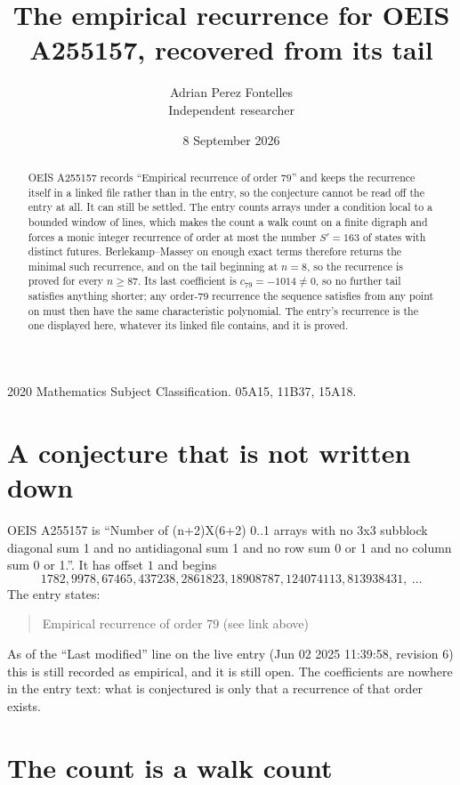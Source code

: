 \documentclass[11pt,a4paper]{article}
\title{The empirical recurrence for OEIS A255157, recovered from its tail}
\author{Adrian Perez Fontelles\\ \small Independent researcher}
\date{8 September 2026}
\theoremstyle{plain}
\theoremstyle{definition}
\begin{document}
\maketitle

\begin{abstract}
OEIS A255157 records ``Empirical recurrence of order $79$'' and keeps the recurrence itself in
a linked file rather than in the entry, so the conjecture cannot be read off the entry at all.
It can still be settled. The entry counts arrays under a condition local to a bounded window of
lines, which makes the count a walk count on a finite digraph and forces a monic integer
recurrence of order at most the number $S'=163$ of states with distinct futures. Berlekamp--Massey on
enough exact terms therefore returns the minimal such recurrence, and on the tail beginning at $n=8$, so the recurrence is proved for every $n\ge87$.
Its last coefficient is $c_{79}=-1014\neq0$, so no further tail satisfies anything
shorter; any order-$79$ recurrence the sequence satisfies from any point on must then have
the same characteristic polynomial. The entry's recurrence is the one displayed here, whatever
its linked file contains, and it is proved.
\end{abstract}

\noindent\small 2020 Mathematics Subject Classification. 05A15, 11B37, 15A18.\normalsize

\section{A conjecture that is not written down}

OEIS A255157 is ``Number of (n+2)X(6+2) 0..1 arrays with no 3x3 subblock diagonal sum 1 and no antidiagonal sum 1 and no row sum 0 or 1 and no column sum 0 or 1.''. It has offset $1$ and begins
\[
1782, 9978, 67465, 437238, 2861823, 18908787, 124074113, 813938431,\ \dots
\]
The entry states:
\begin{quote}
Empirical recurrence of order 79 (see link above)
\end{quote}
As of the ``Last modified'' line on the live entry (Jun 02 2025 11:39:58, revision 6)
this is still recorded as empirical, and it is still open. The coefficients are nowhere in the
entry text: what is conjectured is only that a recurrence of that order exists.

\section{The count is a walk count}
\end{document}
